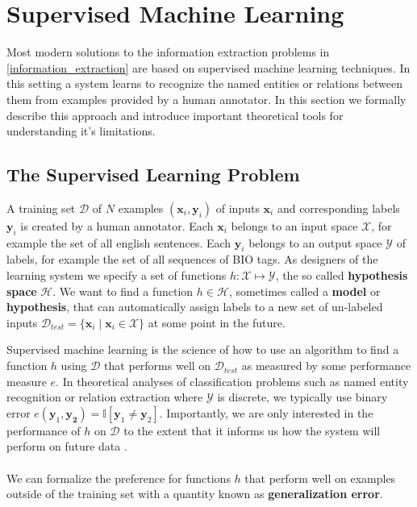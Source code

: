 \section{Supervised Machine Learning}
\label{supervised_machine_learning}

Most modern solutions to the information extraction problems in \ref{information_extraction} are based on supervised machine learning techniques. In this setting a system learns to recognize the named entities or relations between them from examples provided by a human annotator. In this section we formally describe this approach and introduce important theoretical tools for understanding it's limitations.

\subsection{The Supervised Learning Problem}
\label{the_supervised_learning_problem}
A training set $\mathcal{D}$ of $N$ examples $(\mathbf{x}_i, \mathbf{y}_i)$ of inputs $\mathbf{x}_i$ and corresponding labels $\mathbf{y}_i$ is created by a human annotator. Each $\mathbf{x}_i$ belongs to an input space $\mathcal{X}$, for example the set of all english sentences. Each $\mathbf{y}_i$ belongs to an output space $\mathcal{Y}$ of labels, for example the set of all sequences of BIO tags. As designers of the learning system we specify a set of functions $h: \mathcal{X} \mapsto \mathcal{Y}$, the so called \textbf{hypothesis space} $\mathcal{H}$. We want to find a function $h \in \mathcal{H}$, sometimes called a \textbf{model} or \textbf{hypothesis}, that can automatically assign labels to a new set of un-labeled inputs $\mathcal{D}_{test} = \{ \mathbf{x}_i \mid \mathbf{x}_i \in \mathcal{X}\}$ at some point in the future. 

Supervised machine learning is the science of how to use an algorithm to find a function $h$ using $\mathcal{D}$ that performs well on $\mathcal{D}_{test}$ as measured by some performance measure $e$. In theoretical analyses of classification problems such as named entity recognition or relation extraction where $\mathcal{Y}$ is discrete, we typically use binary error $e(\mathbf{y}_1, \mathbf{y_2}) = \mathbb{I}[\mathbf{y}_1 \neq \mathbf{y}_2]$. Importantly, we are only interested in the performance of $h$ on $\mathcal{D}$ to the extent that it informs us how the system will perform on future data \citep{yaser12}.
\\\\
We can formalize the preference for functions $h$ that perform well on examples outside of the training set with a quantity known as \textbf{generalization error}.

